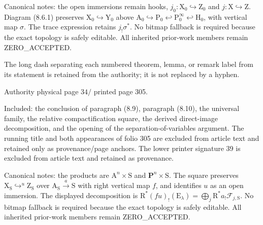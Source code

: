 \documentclass[10pt,leqno]{article}
\begin{document}
\noindent Canonical notes: the open immersions remain hooks, \(j_{0}:\mathrm{X}_{0}\hookrightarrow \mathrm{Z}_{0}\) and \(j:\mathrm{X}\hookrightarrow \mathrm{Z}\). Diagram (8.6.1) preserves \(\mathrm{X}_{0}\hookrightarrow \mathrm{Y}_{0}\) above \(\mathrm{A}_{0}\hookrightarrow \mathrm{P}_{0}\hookleftarrow \mathrm{P}_{0}^{\infty }\hookleftarrow \mathrm{H}_{0}\), with vertical map \(\sigma \). The trace expression retains \(j_{!}\sigma ^{*}\). No bitmap fallback is required because the exact topology is safely editable. All inherited prior-work members remain ZERO\_ACCEPTED.\par

\noindent The long dash separating each numbered theorem, lemma, or remark label from its statement is retained from the authority; it is not replaced by a hyphen.\par

\clearpage

\label{physical-34}\par\smallskip

\noindent Authority physical page \(34 /\) printed page 305.\par

\noindent Included: the conclusion of paragraph (8.9), paragraph (8.10), the universal family, the relative compactification square, the derived direct-image decomposition, and the opening of the separation-of-variables argument. The running title and both appearances of folio 305 are excluded from article text and retained only as provenance/page anchors. The lower printer signature 39 is excluded from article text and retained as provenance.\par

\noindent Canonical notes: the products are \(\mathrm{A}^{n}\times \mathrm{S}\) and \(\mathbf{P}^{n}\times \mathrm{S}\). The square preserves \(\mathrm{X}_{\mathrm{S}}\hookrightarrow ^{u} \mathrm{Z}_{\mathrm{S}}\) over \(\mathrm{A}_{\mathrm{S}}\xrightarrow{a} \mathrm{S}\) with right vertical map \(f\), and identifies \(u\) as an open immersion. The displayed decomposition is \(\mathrm{R}^{*}(fu)_{!}(\mathrm{E}_{\lambda })=\bigoplus\limits_{j} \mathrm{R}^{*}a_{!}\mathcal{F} _{j,\mathrm{S}}\). No bitmap fallback is required because the exact topology is safely editable. All inherited prior-work members remain ZERO\_ACCEPTED.\par

\clearpage
\end{document}
